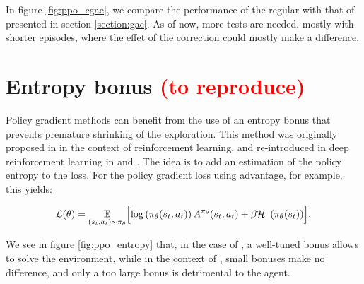 In figure \ref{fig:ppo_cgae}, we compare the performance of the regular \gae with that of \cgae presented in section \ref{section:gae}. As of now, more tests are needed, mostly with shorter episodes, where the effet of the \cgae correction could mostly make a difference.



\section{Entropy bonus \textcolor{red}{(to reproduce)}}

Policy gradient methods can benefit from the use of an entropy bonus that prevents premature shrinking of the exploration. This method was originally proposed in \cite{williams1991} in the context of reinforcement learning, and re-introduced in deep reinforcement learning in \cite{a2c} and \cite{ppo}. The idea is to add an estimation of the policy entropy to the loss. For the policy gradient loss using advantage, for example, this yields:

\begin{equation}
	\mathcal{L}(\theta) = \expect{(s_t, a_t) \sim \pi_\theta} \Bigl[ \log \left( \pi_\theta (s_t, a_t) \right) A^{\pi_\theta} (s_t, a_t) + \beta \entropy \left( \pi_\theta (s_t) \right) \Bigr].
\end{equation}

We see in figure \ref{fig:ppo_entropy} that, in the case of , a well-tuned bonus allows to solve the environment, while in the context of , small bonuses make no difference, and only a too large bonus is detrimental to the agent.





